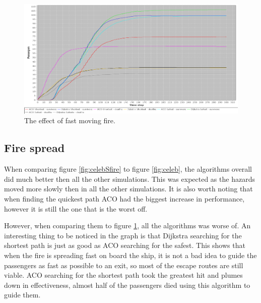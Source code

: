\begin{figure} [h]
\centering
\hspace*{-1.0in}
\includegraphics[scale=0.35]{images/Graph-using-200-rounds-140-passangers-and-fast-fire.png}
\caption{The effect of fast moving fire.}
\label{fig:celebFfire}
\end{figure}

\subsection{Fire spread}

When comparing figure \ref{fig:celebSfire} to figure \ref{fig:celeb}, the algorithms overall did much better then all the other simulations. This was expected as the hazards moved more slowly then in all the other simulations. It is also worth noting that when finding the quickest path ACO had the biggest increase in performance, however it is still the one that is the worst off.

However, when comparing them to figure \ref{fig:celebFfire}, all the algorithms was worse of. An interesting thing to be noticed in the graph is that Dijkstra searching for the shortest path is just as good as ACO searching for the safest. This shows that when the fire is spreading fast on board the ship, it is not a bad idea to guide the passengers as fast as possible to an exit, so most of the escape routes are still viable. ACO searching for the shortest path took the greatest hit and plumes down in effectiveness, almost half of the passengers died using this algorithm to guide them.




